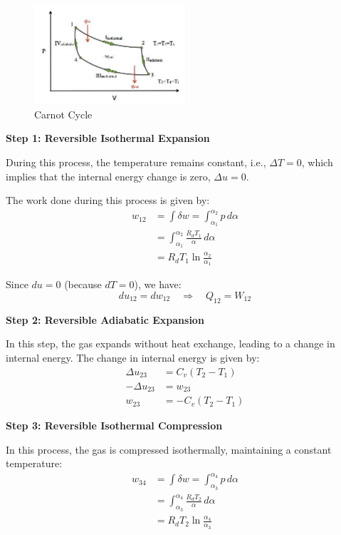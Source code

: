\documentclass[fleqn,10pt]{SelfArx} %
\begin{document}
\begin{figure}[ht]
    \begin{center}
        \includegraphics[width=0.5\textwidth]{Figures/Carnot_cycle.png}
    \end{center}
    \caption{Carnot Cycle}\label{fig:carnot_cycle}
\end{figure}

\textbf{Step 1: Reversible Isothermal Expansion}

During this process, the temperature remains constant, i.e., \( \Delta T = 0 \), which implies that the internal energy change is zero, \( \Delta u = 0 \).

The work done during this process is given by:
\begin{align}
    w_{12} &= \int \delta w = \int_{\alpha_1}^{\alpha_2} p \, d\alpha \\
    &= \int_{\alpha_1}^{\alpha_2} \frac{R_d T_1}{\alpha} \, d\alpha \\
    &= R_d T_1 \ln \frac{\alpha_2}{\alpha_1} \label{eq:w12}
\end{align}

Since $du = 0$ (because $dT = 0$), we have:
$$
du_{12} = dw_{12} \quad \Rightarrow \quad Q_{12} = W_{12}
$$ 

\textbf{Step 2: Reversible Adiabatic Expansion}

In this step, the gas expands without heat exchange, leading to a change in internal energy. The change in internal energy is given by:
\begin{align}
    \Delta u_{23} &= C_v(T_2 - T_1) \\
    -\Delta u_{23} &= w_{23} \\
    w_{23} &= -C_v(T_2 - T_1) \label{eq:w23}
\end{align}

\textbf{Step 3: Reversible Isothermal Compression}

In this process, the gas is compressed isothermally, maintaining a constant temperature:
\begin{align}
    w_{34} &= \int \delta w = \int_{\alpha_3}^{\alpha_4} p \, d\alpha \\
    &= \int_{\alpha_3}^{\alpha_4} \frac{R_d T_2}{\alpha} \, d\alpha \\
    &= R_d T_2 \ln \frac{\alpha_4}{\alpha_3} \label{eq:w34}
\end{align}
\end{document}
